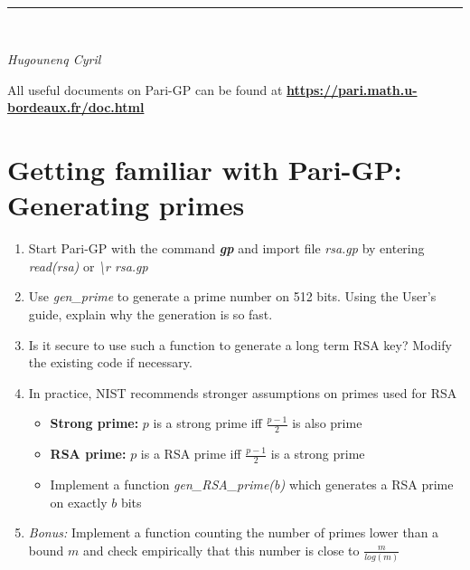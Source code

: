 \documentclass[12pt]{article}
\begin{document}
\begin{minipage}{.3\textwidth}%
\end{minipage} \hfill
{}\\\hrule \ \\
\begin{minipage}[t]{0.5\textwidth}\sf\textit{Hugounenq Cyril}
\end{minipage} \hfill%
\vspace{0.5em}

All useful documents on Pari-GP can be found at  {\bf \url{https://pari.math.u-bordeaux.fr/doc.html}}

\section{Getting familiar with Pari-GP: Generating primes}
\begin{enumerate}
	\item Start Pari-GP with the command {\it \bf gp} and import file {\it rsa.gp} by entering {\it read(rsa)} or {\it \textbackslash r rsa.gp}
	\item Use {\it gen\_prime} to generate a prime number on 512 bits. Using the User's guide, explain why the generation is so fast.
	\item Is it secure to use such a function to generate a long term RSA key? Modify the existing code if necessary.
	\item In practice, NIST recommends stronger assumptions on primes used for RSA
	\begin{itemize}
		\item {\bf Strong prime:} $p$ is a strong prime iff $\frac{p-1}{2}$ is also prime
		\item {\bf RSA prime:} $p$ is a RSA prime iff $\frac{p-1}{2}$ is a strong prime
		\item Implement a function {\it gen\_RSA\_prime(b)} which generates a RSA prime on exactly $b$ bits
	\end{itemize}
	\item {\it Bonus:} Implement a function counting the number of primes lower than a bound $m$ and check empirically that this number is close to $\frac{m}{log(m)}$
\end{enumerate}
\end{document}
